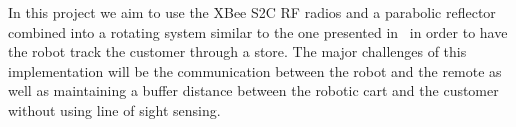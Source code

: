 \documentclass[letterpaper,12pt]{article}   %
\begin{document}
\vspace*{12pt}
In this project we aim to use the XBee S2C RF radios and a parabolic reflector combined into a rotating system similar to the one presented in~\cite{Miah2018-Intelligent} in order to have the robot track the customer through a store. The major challenges of this implementation will be the communication between the robot and the remote as well as maintaining a buffer distance between the robotic cart and the customer without using line of sight sensing.


\end{document}

